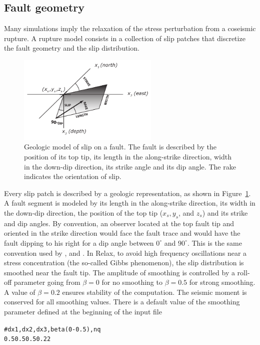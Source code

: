 \documentclass[10pt]{article}
\begin{document}
\subsection{Fault geometry}
Many simulations imply the relaxation of the stress perturbation from a coseismic rupture. A rupture model consists in a collection of slip patches that discretize the fault geometry and the slip distribution.
%
\begin{figure}[h]
\centering\includegraphics[width=0.6\textwidth]{geologic_fault.pdf}
\caption{Geologic model of slip on a fault. The fault is described by the position of its top tip, its length in the along-strike direction, width in the down-dip direction, its strike angle and its dip angle. The rake indicates the orientation of slip.}
\label{fig:geologic_fault}
\end{figure}
%
Every slip patch is described by a geologic representation, as shown in Figure~\ref{fig:geologic_fault}. A fault segment is modeled by its length in the along-strike direction, its width in the down-dip direction, the position of the top tip ($x_s, y_s$, and $z_s$) and its strike and dip angles. By convention, an observer located at the top fault tip and oriented in the strike direction would face the fault trace and would have the fault dipping to his right for a dip angle between $0^\circ$ and $90^\circ$. This is the same convention used by \cite{okada92}, \cite{wang+03a} and \cite{wang+06a}. In Relax, to avoid high frequency oscillations near a stress concentration (the so-called Gibbs phenomenon), the slip distribution is smoothed near the fault tip. The amplitude of smoothing is controlled by a roll-off parameter going from $\beta=0$ for no smoothing to $\beta=0.5$ for strong smoothing. A value of $\beta=0.2$ ensures stability of the computation. The seismic moment is conserved for all smoothing values. There is a default value of the smoothing parameter defined at the beginning of the input file
\begin{alltt}
# dx1,dx2,dx3,beta (0-0.5),nq
0.5 0.5 0.5 {\color{orange}0.2} 2
\end{alltt}
\end{document}

